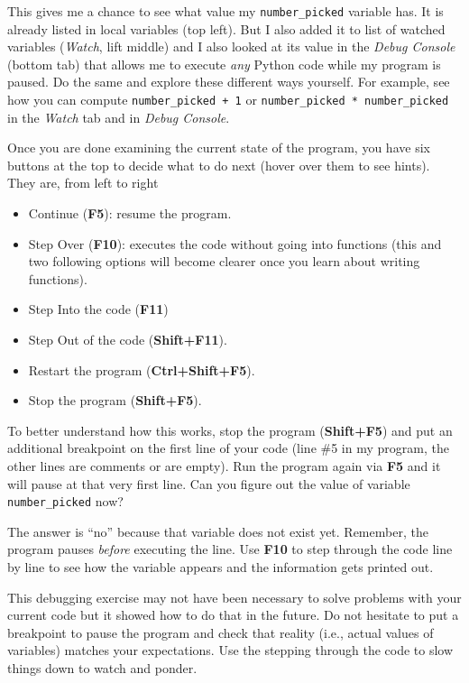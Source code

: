 \documentclass[
]{book}
\providecommand{\tightlist}{%
  \setlength{\itemsep}{0pt}\setlength{\parskip}{0pt}}
\begin{document}
This gives me a chance to see what value my \texttt{number\_picked} variable has. It is already listed in local variables (top left). But I also added it to list of watched variables (\emph{Watch}, lift middle) and I also looked at its value in the \emph{Debug Console} (bottom tab) that allows me to execute \emph{any} Python code while my program is paused. Do the same and explore these different ways yourself. For example, see how you can compute \texttt{number\_picked\ +\ 1} or \texttt{number\_picked\ *\ number\_picked} in the \emph{Watch} tab and in \emph{Debug Console}.

Once you are done examining the current state of the program, you have six buttons at the top to decide what to do next (hover over them to see hints). They are, from left to right

\begin{itemize}
\tightlist
\item
  Continue (\textbf{F5}): resume the program.
\item
  Step Over (\textbf{F10}): executes the code without going into functions (this and two following options will become clearer once you learn about writing functions).
\item
  Step Into the code (\textbf{F11})
\item
  Step Out of the code (\textbf{Shift+F11}).
\item
  Restart the program (\textbf{Ctrl+Shift+F5}).
\item
  Stop the program (\textbf{Shift+F5}).
\end{itemize}

To better understand how this works, stop the program (\textbf{Shift+F5}) and put an additional breakpoint on the first line of your code (line \#5 in my program, the other lines are comments or are empty). Run the program again via \textbf{F5} and it will pause at that very first line. Can you figure out the value of variable \texttt{number\_picked} now?

The answer is ``no'' because that variable does not exist yet. Remember, the program pauses \emph{before} executing the line. Use \textbf{F10} to step through the code line by line to see how the variable appears and the information gets printed out.

This debugging exercise may not have been necessary to solve problems with your current code but it showed how to do that in the future. Do not hesitate to put a breakpoint to pause the program and check that reality (i.e., actual values of variables) matches your expectations. Use the stepping through the code to slow things down to watch and ponder.
\end{document}
